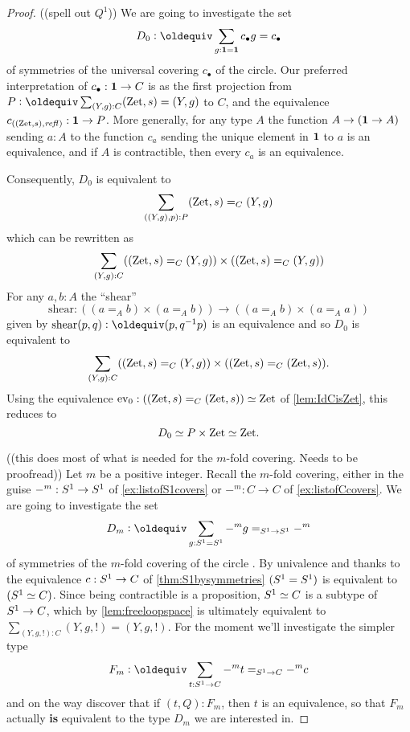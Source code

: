   \begin{proof}
  ((spell out $Q^1$))
We are going to investigate the set 
$$D_0\defequi\sum_{g:\bn 1=\bn 1}c_\bullet g=c_\bullet$$ 
of symmetries of the universal covering $c_\bullet$ of the circle.  
Our preferred interpretation of $c_\bullet:\mathbf{1}\to C$ is as the first projection from $P\defequi\sum_{(Y,g):C}(\zet,s)=(Y,g)$ to $C$, and the equivalence $c_{((\mathrm{Zet},s),\mathop{{\it refl}_{}})}:\mathbf{1}\to P$. %
More generally, for any type $A$ the function $A\to(\mathbf{1}\to A)$ sending $a:A$ to the function $c_a$ sending the unique element in $\mathbf{1}$ to $a$ is an equivalence, and if $A$ is contractible, then every $c_a$ is an equivalence.

   Consequently, $D_0$ is equivalent to
$$\sum_{((Y,g),p):P}(\mathrm{Zet},s)=_C(Y,g)$$ 
which can be rewritten as
$$\sum_{(Y,g):C}((\mathrm{Zet},s)=_C(Y,g))\times((\mathrm{Zet},s)=_C(Y,g))
$$
For any $a,b:A$ the ``shear'' 
$$\mathrm{shear}:((a=_Ab)\times(a=_Ab))\to((a=_Ab)\times(a=_Aa))$$ 
given by $\mathrm{shear}(p,q)\defequi(p,q^{-1}p)$
is an equivalence and
so $D_0$ is equivalent to 
$$\sum_{(Y,g):C}((\mathrm{Zet},s)=_C(Y,g))\times ((\mathrm{Zet},s)=_C(\mathrm{Zet},s)).
$$
Using the equivalence $\mathrm{ev}_0:((\mathrm{Zet},s)=_C(\mathrm{Zet},s))\simeq\mathrm{Zet}$ of \cref{lem:IdCisZet}, this
 reduces to 
$$D_0\simeq P\times\mathrm{Zet}\simeq\mathrm{Zet}.$$
    
((this does most of what is needed for the $m$-fold covering.  Needs to be proofread))
    Let $m$ be a positive integer.  
Recall the $m$-fold covering, either in the guise $-^m:S^1\to S^1$ of \cref{ex:listofS1covers} or $-^m:C\to C$ of \cref{ex:listofCcovers}.
We are going to investigate the set
$$D_m\defequi\sum_{g:\Sc=\Sc}-^mg=_{\Sc\to \Sc}-^m$$  
of symmetries of the $m$-fold covering of the circle%
.  
By univalence and thanks to the equivalence $c:S^1\to C$ of \cref{thm:S1bysymmetries} $(S^1= S^1)$ is equivalent to $(S^1\simeq C)$.
Since being contractible is a proposition, $S^1\simeq C$ is a subtype of $S^1\to C$,
which by \cref{lem:freeloopspace} is ultimately equivalent to $\sum_{(Y,g,!):C}(Y,g,!)=(Y,g,!)$. 
For the moment we'll investigate the simpler type 
$$F_m\defequi\sum_{t:\Sc\to C}-^mt=_{\Sc\to C}-^mc$$
and on the way discover that if $(t,Q):F_m$, then $t$ is an equivalence, so that $F_m$ actually {\bf is} equivalent to the type $D_m$ we are interested in.


\end{proof}
